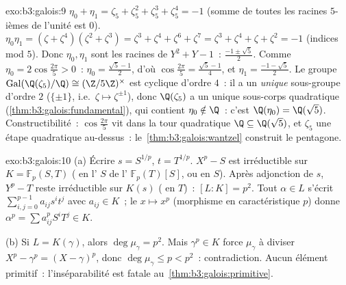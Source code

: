\begin{solution}{exo:b3:galois:9}
$\eta_0 + \eta_1 = \zeta_5 + \zeta_5^2 + \zeta_5^3 + \zeta_5^4
= -1$ (somme de toutes les racines $5$-ièmes de l'unité est
$0$). $\eta_0\eta_1 = (\zeta + \zeta^4)(\zeta^2 + \zeta^3) =
\zeta^3 + \zeta^4 + \zeta^6 + \zeta^7 = \zeta^3 + \zeta^4 +
\zeta + \zeta^2 = -1$ (indices mod $5$). Donc $\eta_0, \eta_1$
sont les racines de $Y^2 + Y - 1$~: $\frac{-1 \pm \sqrt5}{2}$.
Comme $\eta_0 = 2\cos\frac{2\pi}5 > 0$~: $\eta_0 =
\frac{\sqrt5 - 1}{2}$, d'où $\cos\frac{2\pi}5 =
\frac{\sqrt5 - 1}{4}$, et $\eta_1 = \frac{-1-\sqrt5}{2}$. Le
groupe $\operatorname{Gal}(\Q(\zeta_5)/\Q) \cong
(\Z/5\Z)^\times$ est cyclique d'ordre $4$~: il a un
\emph{unique} sous-groupe d'ordre $2$ ($\{\pm1\}$, i.e.\ $\zeta
\mapsto \zeta^{\pm1}$), donc $\Q(\zeta_5)$ a un unique
sous-corps quadratique (\cref{thm:b3:galois:fundamental}), qui
contient $\eta_0 \notin \Q$~: c'est $\Q(\eta_0) = \Q(\sqrt5)$.
Constructibilité~: $\cos\frac{2\pi}5$ vit dans la tour
quadratique $\Q \subseteq \Q(\sqrt5)$, et $\zeta_5$ une étape
quadratique au-dessus~: le~\cref{thm:b3:galois:wantzel}
construit le pentagone.
\end{solution}

\begin{solution}{exo:b3:galois:10}
(a) Écrire $s = S^{1/p}$, $t = T^{1/p}$. $X^p - S$ est
irréductible sur $K = \mathbb F_p(S,T)$ ( en l' $S$ de l' $\mathbb F_p(T)[S]$, ou  en $S$).
Après adjonction de $s$, $Y^p - T$ reste irréductible sur
$K(s)$ ( en $T$)~: $[L:K] = p^2$. Tout $\alpha \in L$
s'écrit $\sum_{i,j=0}^{p-1} a_{ij} s^i t^j$ avec $a_{ij} \in
K$~; le  $x \mapsto x^p$ (morphisme en caractéristique
$p$) donne $\alpha^p = \sum a_{ij}^p S^i T^j \in K$.

(b) Si $L = K(\gamma)$, alors $\deg\mu_\gamma = p^2$. Mais
$\gamma^p \in K$ force $\mu_\gamma$ à diviser $X^p - \gamma^p
= (X-\gamma)^p$, donc $\deg \mu_\gamma \leq p < p^2$~:
contradiction. Aucun élément primitif~: l'inséparabilité est
fatale au~\cref{thm:b3:galois:primitive}.
\end{solution}

